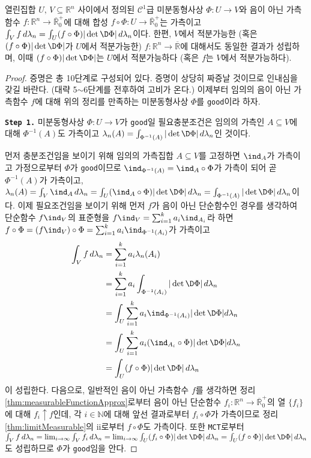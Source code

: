 \begin{theorem}
    열린집합 $U,\,V\subseteq\mathbb{R}^n$ 사이에서 정의된 $\mathcal{C}^1$급 미분동형사상 $\Phi:U\to V$와 음이 아닌 가측함수 $f:\mathbb{R}^n\to\overline{\mathbb{R}}^+_0$에 대해 합성 $f\circ\Phi:U\to\overline{\mathbb{R}}^+_0$는 가측이고 $\int_V f\,d\lambda_n=\int_U(f\circ\Phi)|\det\D\Phi|\,d\lambda_n$이다. 한편, $V$에서 적분가능한 (혹은 $(f\circ\Phi)|\det\D\Phi|$가 $U$에서 적분가능한) $f:\mathbb{R}^n\to\overline{\mathbb{R}}$에 대해서도 동일한 결과가 성립하며, 이때 $(f\circ\Phi)|\det\D\Phi|$는 $U$에서 적분가능하다 (혹은 $f$는 $V$에서 적분가능하다).\footnotemark
\end{theorem}
 
\begin{proof}
    증명은 총 10단계로 구성되어 있다. 증명이 상당히 짜증날 것이므로 인내심을 갖길 바란다. (대략 5$\sim$6단계를 전후하여 고비가 온다.) 이제부터 임의의 음이 아닌 가측함수 $f$에 대해 위의 정리를 만족하는 미분동형사상 $\Phi$를 \texttt{good}이라 하자.

    \noindent\texttt{\textbf{Step 1.}} 미분동형사상 $\Phi:U\to V$가 \texttt{good}일 필요충분조건은 임의의 가측인 $A\subseteq V$에 대해 $\Phi^{-1}(A)$도 가측이고 $\lambda_n(A)=\int_{\Phi^{-1}(A)}|\det\D\Phi|\,d\lambda_n$인 것이다.

    먼저 충분조건임을 보이기 위해 임의의 가측집합 $A\subseteq V$를 고정하면 $\ind_A$가 가측이고 가정으로부터 $\Phi$가 \texttt{good}이므로 $\ind_{\Phi^{-1}(A)}=\ind_A\circ\Phi$가 가측이 되어 곧 $\Phi^{-1}(A)$가 가측이고, $\lambda_n(A)=\int_V\ind_A\,d\lambda_n=\int_U(\ind_A\circ\Phi)|\det\D\Phi|\,d\lambda_n=\int_{\Phi^{-1}(A)}|\det\D\Phi|\,d\lambda_n$이다. 이제 필요조건임을 보이기 위해 먼저 $f$가 음이 아닌 단순함수인 경우를 생각하여 단순함수 $f\ind_V$의 표준형을 $f\ind_V=\sum_{i=1}^ka_i\ind_{A_i}$라 하면 $f\circ\Phi=(f\ind_V)\circ\Phi=\sum_{i=1}^ka_i\ind_{\Phi^{-1}(A_i)}$가 가측이고
    \begin{align*}
        \int_Vf\,d\lambda_n&=\sum_{i=1}^ka_i\lambda_n(A_i)\\
        &=\sum_{i=1}^ka_i\int_{\Phi^{-1}(A_i)}|\det\D\Phi|\,d\lambda_n\\
        &=\int_U\sum_{i=1}^ka_i\ind_{\Phi^{-1}(A_i)}|\det\D\Phi|d\lambda_n\\
        &=\int_U\sum_{i=1}^ka_i(\ind_{A_i}\circ\Phi)|\det\D\Phi|d\lambda_n\\
        &=\int_U(f\circ\Phi)|\det\D\Phi|\,d\lambda_n
    \end{align*}
    이 성립한다. 다음으로, 일반적인 음이 아닌 가측함수 $f$를 생각하면 정리 \ref{thm:measurableFunctionApprox}로부터 음이 아닌 단순함수 $f_i:\mathbb{R}^n\to\overline{\mathbb{R}}^+_0$의 열 $\{f_i\}$에 대해 $f_i\uparrow f$인데, 각 $i\in\mathbb{N}$에 대해 앞선 결과로부터 $f_i\circ\Phi$가 가측이므로 정리 \ref{thm:limitMeasurable}의 ii로부터 $f\circ\Phi$도 가측이다. 또한 \texttt{MCT}로부터 $\int_Vf\,d\lambda_n=\lim_{i\to\infty}\int_Vf_i\,d\lambda_n=\lim_{i\to\infty}\int_U(f_i\circ\Phi)|\det\D\Phi|\,d\lambda_n=\int_U(f\circ\Phi)|\det\D\Phi|\,d\lambda_n$도 성립하므로 $\Phi$가 \texttt{good}임을 안다.


\end{proof}
